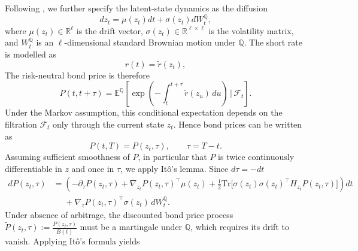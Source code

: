 

Following \citet{MatinWanPoulsen2025}, we further specify the latent-state dynamics as the diffusion
\begin{equation}
    dz_t=\mu(z_t)dt+\sigma(z_t)dW_t^\mathbb{Q},
    \label{latentdynamics}
\end{equation}
where \(\mu(z_t)\in\mathbb{R}^\ell\) is the drift vector, \(\sigma(z_t)\in\mathbb{R}^{\ell\times \ell}\) is the volatility matrix, and \(W_t^\mathbb{Q}\) is an \(\ell\)-dimensional standard Brownian motion under \(\mathbb{Q}\). The short rate is modelled as
\begin{equation}
    r(t)=\tilde{r}(z_t),
    \label{shortratedynamic}
\end{equation}
The risk-neutral bond price is therefore
\[
P(t,t+\tau)
=
\mathbb{E}^{\mathbb{Q}}\!\left[
\exp\!\left(-\int_t^{t+\tau} \tilde r(z_u)\,du\right)
\,\bigg|\,\mathcal{F}_t
\right].
\]
Under the Markov assumption, this conditional expectation depends on the
filtration \(\mathcal F_t\) only through the current state \(z_t\). Hence bond prices can be written as
\[
P(t,T)=P(z_t,\tau), \qquad \tau=T-t.
\]
Assuming sufficient smoothness of $P$, in particular that $P$ is twice continuously differentiable in $z$ and once in $\tau$, we apply Itô's lemma. Since $d\tau=-dt$
\begin{align}
dP(z_t,\tau)
&=
\left(
-\partial_\tau P(z_t,\tau)
+
\nabla_{z_t} P(z_t,\tau)^\top \mu(z_t)
+
\frac12 \mathrm{Tr} \big[\sigma(z_t)\sigma(z_t)^\top H_{z_t} P(z_t,\tau) \big]
\right) dt\nonumber\\
&\phantom{=}+
\nabla_z P(z_t,\tau)^\top \sigma(z_t)\, dW_t^{\mathbb Q}. 
\label{Pdynamics}
\end{align}
Under absence of arbitrage, the discounted bond price process 
\(
\tilde{P}(z_t,\tau) := \frac{P(z_t,\tau)}{B(t)}
\)
must be a martingale under $\mathbb Q$, which requires its drift to vanish. Applying Itô's formula yields 
